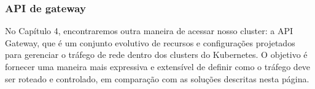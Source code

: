 \documentclass[
]{article}
\begin{document}
\subsubsection{API de gateway}\label{api-de-gateway}

No Capítulo 4, encontraremos outra maneira de acessar nosso cluster: a
API Gateway, que é um conjunto evolutivo de recursos e configurações
projetados para gerenciar o tráfego de rede dentro dos clusters do
Kubernetes. O objetivo é fornecer uma maneira mais expressiva e
extensível de definir como o tráfego deve ser roteado e controlado, em
comparação com as soluções descritas nesta página.
\end{document}
